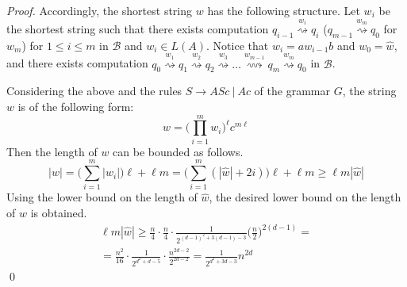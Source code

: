 \documentclass[runningheads]{llncs}
\newcommand{\xra}[1]{\overset{#1}{\rightsquigarrow}}
\begin{document}
\begin{proof}
Accordingly, the shortest string $w$ has the following structure.
Let $w_i$ be the shortest string
such that there exists computation $q_{i-1} \xra{w_i} q_i$ ($q_{m-1} \xra{w_m} q_0$
for $w_m$) for $1 \leqslant i \leqslant m$ in $\mathcal{B}$ and $w_i \in L(A)$.
Notice that $w_i = a w_{i-1} b$ and $w_0 = \widehat{w}$,
and there exists computation
$q_{0} \xra{w_1} q_1 \xra{w_2} q_2 \xra{w_3} \ldots \xra{w_{m-1}} q_{m} \xra{w_m} q_0$
in $\mathcal{B}$.

Considering the above and the rules $S \to ASc \ | \ Ac$ of the grammar $G$,
the string $w$ is of the following form:
\begin{equation*}
w = \Big({\prod_{i=1}^m w_i}\Big)^{\ell}{c}^{m\ell}
\end{equation*}
Then the length of $w$ can be bounded as follows.
\begin{equation*}
	|w|
		=
	\Big({\sum_{i=1}^m |w_i|}\Big)\ell + \ell m
		=
	\Big(\sum_{i=1}^m (|\widehat{w}| + 2i)\Big)\ell + \ell m
		\geqslant
	\ell m |\widehat{w}|
\end{equation*}
Using the lower bound on the length of $\widehat{w}$,
the desired lower bound on the length of $w$ is obtained.
\begin{multline*}
	\ell m |\widehat{w}|
		\geqslant
	\frac{n}{4} \cdot \frac{n}{4} \cdot 
	\frac{1}{2^{(d-1)^2 + 3(d-1) - 3}} \Big(\frac{n}{2}\Big)^{2(d-1)}
		= \\ = %
	\frac{n^2}{16} \cdot 
	\frac{1}{2^{d^2 + d - 5}} \cdot \frac{n^{2d-2}}{2^{2d-2}}
		= %
	\frac{1}{2^{d^2 + 3d -3}} n^{2d}
\end{multline*}
\qed
\end{proof}
\end{document}
